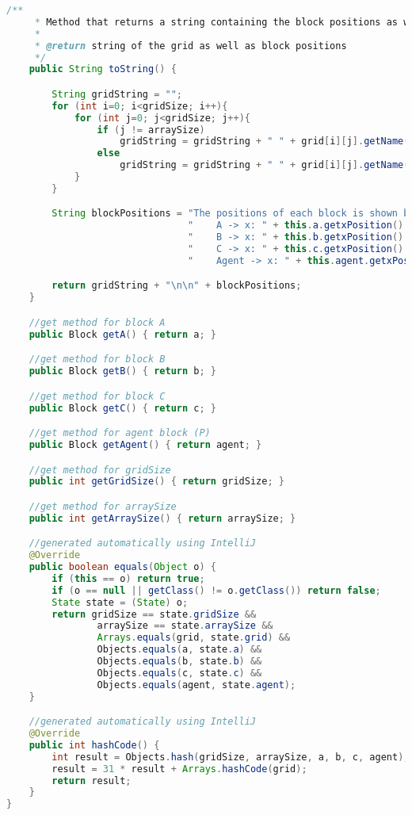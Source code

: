 \documentclass[a4paper, 11pt]{article} %
\begin{document}
\begin{lstlisting}[language=java]
    /**
     * Method that returns a string containing the block positions as well as grid
     *
     * @return string of the grid as well as block positions
     */
    public String toString() {

        String gridString = "";
        for (int i=0; i<gridSize; i++){
            for (int j=0; j<gridSize; j++){
                if (j != arraySize)
                    gridString = gridString + " " + grid[i][j].getName();
                else
                    gridString = gridString + " " + grid[i][j].getName() + "\n";
            }
        }

        String blockPositions = "The positions of each block is shown below: \n" +
                                "    A -> x: " + this.a.getxPosition() + " y: " + this.a.getyPosition() + "\n" +
                                "    B -> x: " + this.b.getxPosition() + " y: " + this.a.getyPosition() + "\n" +
                                "    C -> x: " + this.c.getxPosition() + " y: " + this.a.getyPosition() + "\n" +
                                "    Agent -> x: " + this.agent.getxPosition() + " y: " + this.agent.getyPosition();

        return gridString + "\n\n" + blockPositions;
    }

    //get method for block A
    public Block getA() { return a; }

    //get method for block B
    public Block getB() { return b; }

    //get method for block C
    public Block getC() { return c; }

    //get method for agent block (P)
    public Block getAgent() { return agent; }

    //get method for gridSize
    public int getGridSize() { return gridSize; }

    //get method for arraySize
    public int getArraySize() { return arraySize; }

    //generated automatically using IntelliJ
    @Override
    public boolean equals(Object o) {
        if (this == o) return true;
        if (o == null || getClass() != o.getClass()) return false;
        State state = (State) o;
        return gridSize == state.gridSize &&
                arraySize == state.arraySize &&
                Arrays.equals(grid, state.grid) &&
                Objects.equals(a, state.a) &&
                Objects.equals(b, state.b) &&
                Objects.equals(c, state.c) &&
                Objects.equals(agent, state.agent);
    }

    //generated automatically using IntelliJ
    @Override
    public int hashCode() {
        int result = Objects.hash(gridSize, arraySize, a, b, c, agent);
        result = 31 * result + Arrays.hashCode(grid);
        return result;
    }
}

\end{lstlisting}
\end{document}
